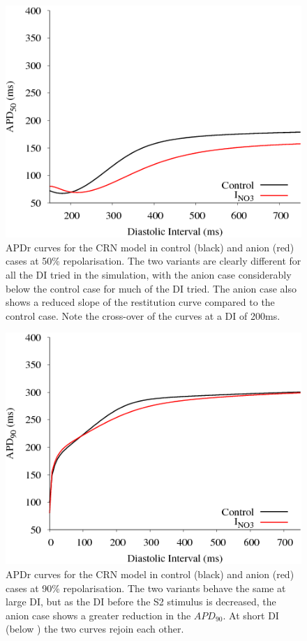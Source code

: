 \begin{figure}
\includegraphics{figures/toolkit/anion/03_S1S2_50}
\caption[Anion Sensitive APD Restitution at 50 repolarization]{
\label{anion:apdr50} APDr curves for the CRN model in control (black) and anion
(red) cases at 50\% repolarisation.  The two variants are clearly different for
all the DI tried in the simulation, with the anion case considerably below the
control case for much of the DI tried.  The anion case also shows a reduced
slope of the restitution curve compared to the control case.  Note the
cross-over of the curves at a DI of \unit{200}{ms}.}
\end{figure}

\begin{figure}
\includegraphics{figures/toolkit/anion/02_S1S2_90}
\caption[Anion Sensitive APD Restitution at 90 repolarization]{
\label{anion:apdr90} APDr curves for the CRN model in control (black) and anion
(red) cases at 90\% repolarisation.  The two variants behave the same at large
DI, but as the DI before the S2 stimulus is decreased, the anion case shows a
greater reduction in the $APD_{90}$.  At short DI (below ) the two curves
rejoin each other.}
\end{figure}

